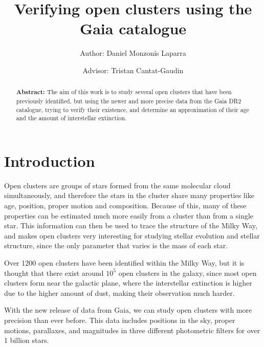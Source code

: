 \documentclass[twocolumn]{revtex4}
\begin{document}
\pagestyle{fancy}


\title{Verifying open clusters using the Gaia catalogue}
\author{Author: Daniel Monzonís Laparra}
\author{Advisor: Tristan Cantat-Gaudin}

\begin{abstract}
{\bf Abstract:} The aim of this work is to study several open clusters that have been previously identified, but using the newer and more precise data from the Gaia DR2 catalogue, trying to verify their existence, and determine an approximation of their age and the amount of interstellar extinction.
\end{abstract}

\maketitle

\section{Introduction}
Open clusters are groups of stars formed from the same molecular cloud simultaneously, and therefore the stars in the cluster share many properties like age, position, proper motion and composition. Because of this, many of these properties can be estimated much more easily from a cluster than from a single star. This information can then be used to trace the structure of the Milky Way, and makes open clusters very interesting for studying stellar evolution and stellar structure, since the only parameter that varies is the mass of each star.

Over 1200 open clusters have been identified within the Milky Way, but it is thought that there exist around $10^5$ open clusters in the galaxy, since most open clusters form near the galactic plane, where the interstellar extinction is higher due to the higher amount of dust, making their observation much harder.\cite{star-clusters}

With the new release of data from Gaia, we can study open clusters with more precision than ever before. This data includes positions in the sky, proper motions, parallaxes, and magnitudes in three different photometric filters for over 1 billion stars.
\end{document}
